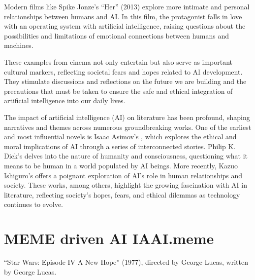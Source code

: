 \documentclass[a4paper,12pt,english]{sphinxmanual}
\begin{document}
\sphinxAtStartPar
Modern films like Spike Jonze’s “Her” (2013) explore more intimate and
personal relationships between humans and AI. In this film, the
protagonist falls in love with an operating system with artificial
intelligence, raising questions about the possibilities and limitations
of emotional connections between humans and machines.

\sphinxAtStartPar
These examples from cinema not only entertain but also serve as
important cultural markers, reflecting societal fears and hopes related
to AI development. They stimulate discussions and reflections on the
future we are building and the precautions that must be taken to ensure
the safe and ethical integration of artificial intelligence into our
daily lives.

\sphinxAtStartPar
The impact of artificial intelligence (AI) on literature has been profound, shaping
narratives and themes across numerous groundbreaking works. One of the earliest and
most influential novels is Isaac Asimov’s , which explores the ethical and
moral implications of AI through a series of interconnected stories. Philip K. Dick’s
 delves into the nature of humanity and
consciousness, questioning what it means to be human in a world populated by AI
beings. More recently, Kazuo Ishiguro’s  offers a poignant
exploration of AI’s role in human relationships and society. These works, among
others, highlight the growing fascination with AI in literature, reflecting society’s
hopes, fears, and ethical dilemmas as technology continues to evolve.


\chapter{MEME driven AI \sphinxhyphen{} IAAI.meme}
\label{\detokenize{index:meme-driven-ai-iaai-meme}}
\sphinxAtStartPar
{} %
\begin{footnote}[9]\sphinxAtStartFootnote
“Star Wars: Episode IV \sphinxhyphen{} A New Hope” (1977), directed by
George Lucas, written by George Lucas.
%
\end{footnote}

\sphinxAtStartPar
{}
\end{document}
